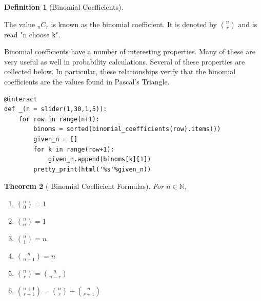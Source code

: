 \documentclass[10pt,]{book}
\theoremstyle{plain}
\newtheorem{theorem}{Theorem}[section]
\theoremstyle{definition}
\newtheorem{definition}[theorem]{Definition}
\theoremstyle{definition}
\theoremstyle{definition}
\numberwithin{equation}{section}
\begin{document}
\begin{definition}[{Binomial Coefficients}]\label{definition-18}

		The value \(_nC_r\) is known as the binomial coefficient. It is
		denoted by \({n \choose r}\) and is read "n choose k".
\end{definition}
\par
Binomial coefficients have a number of interesting properties.  Many of these are very useful as well in probability calculations.  Several of these properties are collected below. In particular, these relationships verify that the binomial coefficients are the values found in Pascal's Triangle.%
\begin{lstlisting}[style=sageinput]
@interact
def _(n = slider(1,30,1,5)):
    for row in range(n+1):
        binoms = sorted(binomial_coefficients(row).items())
        given_n = []
        for k in range(row+1):
            given_n.append(binoms[k][1])
        pretty_print(html('%s'%given_n))
\end{lstlisting}
\begin{theorem}[{ Binomial Coefficient Formulas}]\label{theorem-11}
 For \( n \in \mathbb{N}\),
	\leavevmode%
\begin{enumerate}
\item\hypertarget{li-102}{}\(\binom{n}{0} = 1\)%
\item\hypertarget{li-103}{}\(\binom{n}{n} = 1\)%
\item\hypertarget{li-104}{}\(\binom{n}{1} = n\)%
\item\hypertarget{li-105}{}\(\binom{n}{n-1} = n\)%
\item\hypertarget{li-106}{}\(\binom{n}{r} = \binom{n}{n-r}\)%
\item\hypertarget{li-107}{}\(\binom{n+1}{r+1} = \binom{n}{r} + \binom{n}{r+1}\)%
\end{enumerate}

\end{theorem}
\end{document}
